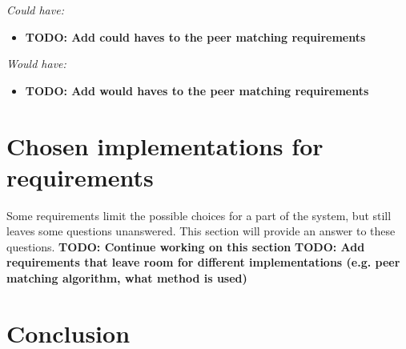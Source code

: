 \documentclass[]{article}
\newcommand{\TODO}[1]{{\color{red}\textbf{TODO: #1}}}
\begin{document}
\emph{Could have:}
\begin{itemize}
\item \TODO{Add could haves to the peer matching requirements}
\end{itemize}

\emph{Would have:}
\begin{itemize}
\item \TODO{Add would haves to the peer matching requirements}
\end{itemize}

\section{Chosen implementations for requirements}
Some requirements limit the possible choices for a part of the system, but still leaves some questions unanswered. This section will provide an answer to these questions.
\TODO{Continue working on this section}
\TODO{Add requirements that leave room for different implementations (e.g. peer matching algorithm, what method is used)}

\section{Conclusion}

\newpage


\end{document}
